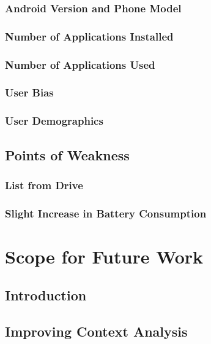 \documentclass[12pt]{uthesis-v12}  %
\begin{document}
		\subsection{Android Version and Phone Model}
		
		\subsection{Number of Applications Installed}
		
		\subsection{Number of Applications Used}
		
		\subsection{User Bias}
		
		\subsection{User Demographics}
	
	\section{Points of Weakness}		
		
		\subsection{List from Drive}
		
		\subsection{Slight Increase in Battery Consumption}
		
\chapter{Scope for Future Work}
		
	\section{Introduction}
		
	\section{Improving Context Analysis}
		
\end{document}

